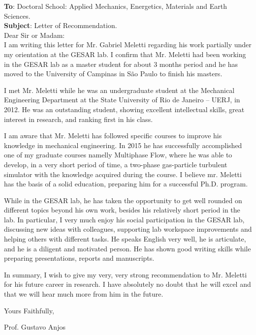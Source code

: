 \documentclass[12pt,a4paper]{article}
\begin{document}
\vspace*{1.5cm}
\noindent \textbf{To}: Doctoral School: Applied Mechanics, Energetics,
Materials and Earth Sciences.\\
\noindent \textbf{Subject}: Letter of Recommendation.\\

\noindent Dear Sir or Madam:\\

I am writing this letter for Mr. Gabriel Meletti regarding his work
partially under my orientation at the GESAR lab. I confirm that Mr.
Meletti had been working in the GESAR lab as a master student for about
3 months period and he has moved to the University of Campinas in S\~ao
Paulo to finish his masters. 

I met Mr. Meletti while he was an undergraduate student at the
Mechanical Engineering Department at the State University of Rio de
Janeiro -- UERJ, in 2012. He was an outstanding student, showing
excellent intellectual skills, great interest in research, and ranking
first in his class.

I am aware that Mr. Meletti has followed specific courses to improve his
knowledge in mechanical engineering. In 2015 he has successfully
accomplished one of my graduate courses namelly Multiphase Flow, where
he was able to develop, in a very short period of time, a two-phase
gas-particle turbulent simulator with the knowledge acquired during the
course. I believe mr. Meletti has the basis of a solid education,
preparing him for a successful Ph.D. program. 

While in the GESAR lab, he has taken the opportunity to get well rounded
on different topics beyond his own work, besides his relatively short
period in the lab. In particular, I very much enjoy his social
participation in the GESAR lab, discussing new ideas with colleagues,
supporting lab workspace improvements and helping others with different
tasks. He speaks English very well, he is articulate, and he
is a diligent and motivated person. He has shown good writing skills
while preparing presentations, reports and manuscripts.

In summary, I wish to give my very, very strong recommendation to Mr.
Meletti for his future career in research. I have absolutely no
doubt that he will excel and that we will hear much more from him in the
future.

Yours Faithfully,

\vspace{2cm}

\begin{center}
Prof. Gustavo Anjos
\end{center}
\end{document}

